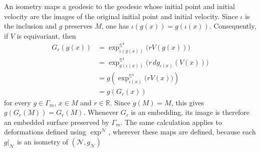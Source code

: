 \documentclass[a4paper,11pt,oneside,reqno]{amsart}
\numberwithin{equation}{section}
\theoremstyle{definition}
\begin{document}
An isometry maps a geodesic to the geodesic whose initial
point and initial velocity are the images of the original
initial point and initial velocity.
Since $\iota$ is the inclusion and $g$ preserves $M$,
one has $\iota(g(x))=g(\iota(x))$.
Consequently, if $V$ is equivariant, then
%
\begin{align*}
    G_r(g(x))
    &=\exp_{\iota(g(x))}^{\mathbb{S}^4}
      \bigl(rV(g(x))\bigr)\\
    &=\exp_{g(\iota(x))}^{\mathbb{S}^4}
      \bigl(r\,d g_{\iota(x)}(V(x))\bigr)\\
    &=g\left(
      \exp_{\iota(x)}^{\mathbb{S}^4}
      \bigl(rV(x)\bigr)\right)\\
    &=g(G_r(x))
\end{align*}
%
for every $g\in\Gamma_m$, $x\in M$ and $r\in\mathbb{R}$.
Since $g(M)=M$, this gives $g(G_r(M))=G_r(M)$.
Whenever $G_r$ is an embedding, its image is therefore
an embedded surface preserved by $\Gamma_m$.
The same calculation applies to deformations defined
using $\exp^{\mathcal N}$, wherever these maps are
defined, because each $g|_{\mathcal N}$ is an isometry
of $(\mathcal N,g_{\mathcal N})$
\end{document}
